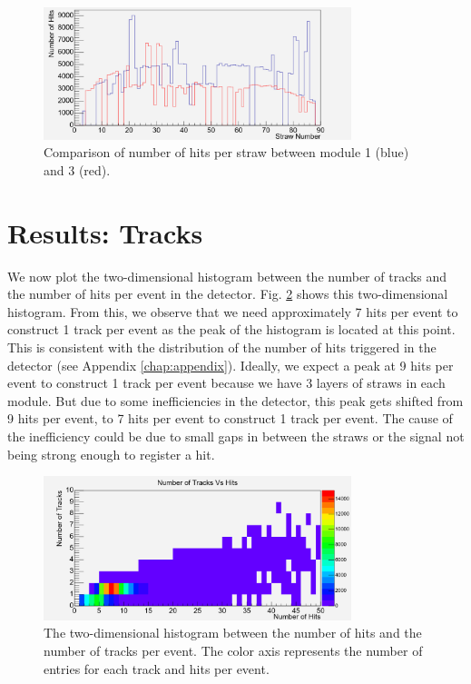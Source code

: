 \documentclass[a4paper]{report}
\numberwithin{equation}{section}
\begin{document}
\begin{figure}[htb!]
	\centering
	\includegraphics[width=0.8\textwidth]{hitsperstraw_m1m3.png}
	\caption{Comparison of number of hits per straw between module 1 (blue) and 3 (red). }
	\label{fig:tracksvshits_comp}
\end{figure}

\section{Results: Tracks}

We now plot the two-dimensional histogram between the number of tracks and the number of hits per event in the detector. Fig. \ref{fig:tracksvshits}
shows this two-dimensional histogram. From this, we observe that we need approximately 7 hits per event to construct 1 track per event
as the peak of the histogram is located at this point. This is consistent with the distribution of the number of hits triggered in 
the detector (see Appendix \ref{chap:appendix}). Ideally, we expect a peak at 9 hits per event to construct 1 track per event because we have 3 layers of straws in each module. But due to some inefficiencies in the detector, this peak gets shifted from 9 hits per event, to 7 hits per event to construct 1 track per event. The cause of the inefficiency could be due to small gaps in between the straws or the signal not being strong enough to register a hit. 

\begin{figure}[htb!]
	\centering
	\includegraphics[width=0.8\textwidth]{trackvshits.png}
	\caption{The two-dimensional histogram between the number of hits and the number of tracks per event. 
			The color axis represents the number of entries for each track and hits per event.}
	\label{fig:tracksvshits}
\end{figure}
\end{document}
